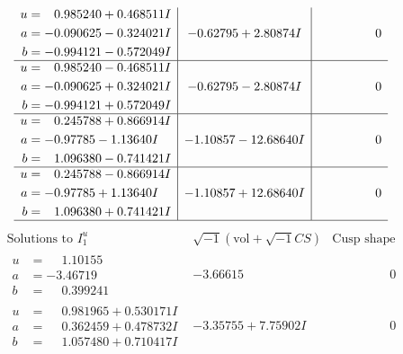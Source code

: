 \documentclass[1p]{elsarticle_modified}
\theoremstyle{definition}
\newcommand{\I}{\sqrt{-1}}
\begin{document}
$$\begin{array}{c|c|c}
\begin{aligned}
u &= \phantom{-}0.985240 + 0.468511 I \\
a &= -0.090625 - 0.324021 I \\
b &= -0.994121 - 0.572049 I\end{aligned}
 & -0.62795 + 2.80874 I & \phantom{-0.000000 } 0 \\ \hline\begin{aligned}
u &= \phantom{-}0.985240 - 0.468511 I \\
a &= -0.090625 + 0.324021 I \\
b &= -0.994121 + 0.572049 I\end{aligned}
 & -0.62795 - 2.80874 I & \phantom{-0.000000 } 0 \\ \hline\begin{aligned}
u &= \phantom{-}0.245788 + 0.866914 I \\
a &= -0.97785 - 1.13640 I \\
b &= \phantom{-}1.096380 - 0.741421 I\end{aligned}
 & -1.10857 - 12.68640 I & \phantom{-0.000000 } 0 \\ \hline\begin{aligned}
u &= \phantom{-}0.245788 - 0.866914 I \\
a &= -0.97785 + 1.13640 I \\
b &= \phantom{-}1.096380 + 0.741421 I\end{aligned}
 & -1.10857 + 12.68640 I & \phantom{-0.000000 } 0\\
 \hline 
 \end{array}$$\newpage$$\begin{array}{c|c|c}  
\text{Solutions to }I^u_{1}& \I (\text{vol} + \sqrt{-1}CS) & \text{Cusp shape}\\
 \hline 
\begin{aligned}
u &= \phantom{-}1.10155\phantom{ +0.000000I} \\
a &= -3.46719\phantom{ +0.000000I} \\
b &= \phantom{-}0.399241\phantom{ +0.000000I}\end{aligned}
 & -3.66615\phantom{ +0.000000I} & \phantom{-0.000000 } 0 \\ \hline\begin{aligned}
u &= \phantom{-}0.981965 + 0.530171 I \\
a &= \phantom{-}0.362459 + 0.478732 I \\
b &= \phantom{-}1.057480 + 0.710417 I\end{aligned}
 & -3.35755 + 7.75902 I & \phantom{-0.000000 } 0 \\ \hline\begin{aligned}

\end{aligned}
\end{array}$$
\end{document}
